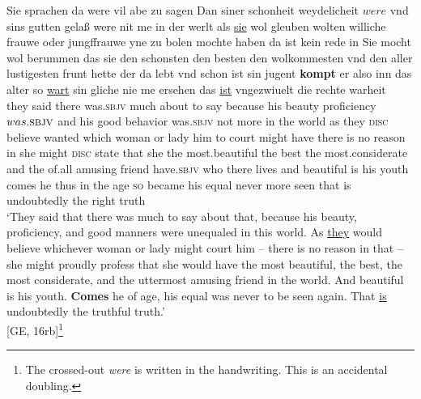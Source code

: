 \documentclass[output=paper,colorlinks,citecolor=brown]{langscibook}
\begin{document}
\ea
\gll Sie sprachen 
da were vil abe zu sagen Dan siner schonheit weydelicheit \sout{$were$} vnd sins gutten gela\ss{} were nit me in der werlt
als \uline{sie} wol gleuben wolten williche frauwe oder jungffrauwe yne zu bolen mochte haben da ist kein rede in Sie mocht wol berummen das sie den schonsten den besten den wolkommesten vnd den aller lustigesten frunt hette der da lebt vnd schon ist sin jugent
\textbf{kompt} er also inn das alter so \uline{wart} sin gliche nie me ersehen das \uline{ist} vngezwiuelt die rechte warheit\\
 they said 
there was.\textsc{sbjv} much about to say because his beauty proficiency \sout{$was.\textsc{sbjv}$} and his good behavior was.\textsc{sbjv} not more in the world 
as they \textsc{disc} believe wanted which woman or lady him to court might have there is no reason in she might \textsc{disc} state that she the most.beautiful the best the most.considerate and the of.all amusing friend have.\textsc{sbjv} who there lives and beautiful is his youth 
comes he thus in the age \textsc{so} became his equal never more seen that is undoubtedly the right truth\\
 \glt `They said that there was much to say about that, because his beauty, proficiency, and good manners were unequaled in this world. As \uline{they} would believe whichever woman or lady might court him -- there is no reason in that -- she might proudly profess that she would have the most beautiful, the best, the most considerate, and the uttermost amusing friend in the world. And beautiful is his youth. \textbf{Comes} he of age, his equal was never to be seen again. That \uline{is} undoubtedly the truthful truth.'\\ \hfill[GE, 16rb]\footnote{The crossed-out \textit{were} is written in the handwriting. This is an accidental doubling.}
\z
\end{document}
